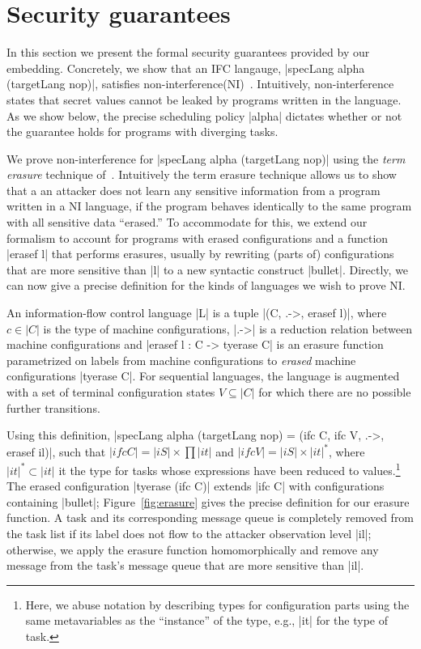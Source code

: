 \section{Security guarantees}
\label{sec:formal}

In this section we present the formal security guarantees provided by
our embedding.
%
Concretely, we show that an IFC langauge, |specLang alpha (targetLang
nop)|, satisfies non-interference(NI)~\tocite{}.
%
Intuitively, non-interference states that secret values cannot be
leaked by programs written in the language.
%
As we show below, the precise scheduling policy |alpha| dictates
whether or not the guarantee holds for programs with diverging tasks.

We prove non-interference for |specLang alpha (targetLang nop)| using
the \emph{term erasure} technique of~\tocite{}.
%
Intuitively the term erasure technique allows us to show that a an
attacker does not learn any sensitive information from a program
written in a NI language, if the program behaves identically to the
same program with all sensitive data ``erased.''
% 
To accommodate for this, we extend our formalism to account for
programs with erased configurations and a function |erasef l| that
performs erasures, usually by rewriting (parts of) configurations that
are more sensitive than |l| to a new syntactic construct |bullet|.
%
Directly, we can now give a precise definition for the kinds of
languages we wish to prove NI.

\begin{definition}
    An information-flow control language |L| is a tuple |(C, .->,
    erasef l)|, where $c \in |C|$ is the type of machine configurations, |.->| is a
    reduction relation between machine configurations and |erasef l : C -> tyerase C|
    is an erasure function parametrized on labels from machine configurations to \emph{erased} machine
    configurations |tyerase C|.  For sequential languages, the
    language is augmented with a set of terminal configuration states $V
    \subseteq |C|$ for which there are no possible further transitions.
\end{definition}

Using this definition, |specLang alpha (targetLang nop) = (ifc C, ifc
V, .->, erasef il)|, such that $|ifc C| = |iS| \times \prod |it|$ and
$|ifc V| = |iS| \times |it|^*$, where $|it|^* \subset |it|$ it the
type for tasks whose expressions have been reduced to
values.\footnote{
  Here, we abuse notation by describing types for configuration parts using the
  same metavariables as the ``instance'' of the type, e.g., |it| for the type of
  task.
}
The erased configuration |tyerase (ifc C)| extends |ifc C| with configurations
containing |bullet|; Figure~\ref{fig:erasure} gives the precise definition for
our erasure function.
%
A task and its corresponding message queue is completely removed from the task
list if its label does not flow to the attacker observation level |il|;
otherwise, we apply the erasure function homomorphically and remove any message
from the task's message queue that are more sensitive than |il|.

